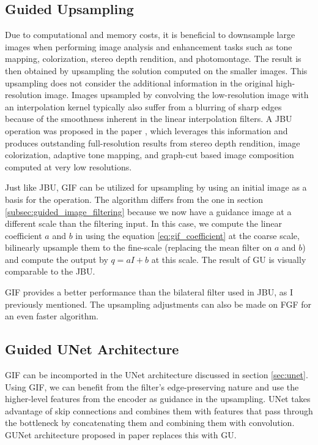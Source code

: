 \subsection{Guided Upsampling}
\label{subsec:guided_upsampling}

Due to computational and memory costs, it is beneficial to downsample large images when performing image analysis and enhancement tasks such as tone mapping, colorization, stereo depth rendition, and photomontage. The result is then obtained by upsampling the solution computed on the smaller images. This upsampling does not consider the additional information in the original high-resolution image. Images upsampled by convolving the low-resolution image with an interpolation kernel typically also suffer from a blurring of sharp edges because of the smoothness inherent in the linear interpolation filters. A \gls{JBU} operation was proposed in the paper \cite{bilateral}, which leverages this information and produces outstanding full-resolution results from stereo depth rendition, image colorization, adaptive tone mapping, and graph-cut based image composition computed at very low resolutions.

Just like \gls{JBU}, \gls{GIF} can be utilized for upsampling by using an initial image as a basis for the operation. The algorithm differs from the one in section \ref{subsec:guided_image_filtering} because we now have a guidance image at a different scale than the filtering input. In this case, we compute the linear coefficient $a$ and $b$ in using the equation \ref{eq:gif_coefficient} at the coarse scale, bilinearly upsample them to the fine-scale (replacing the mean filter on $a$ and $b$) and compute the output by $q = aI + b$ at this scale. The result of \gls{GU} is visually comparable to the \gls{JBU}. \cite{gif}

\gls{GIF} provides a better performance than the bilateral filter used in \gls{JBU}, as I previously mentioned. The upsampling adjustments can also be made on \gls{FGF} for an even faster algorithm.

\subsection{Guided UNet Architecture}
\label{subsec:review_gunet_architecture}

\gls{GIF} can be incomported in the UNet architecture discussed in section \ref{sec:unet}. Using \gls{GIF}, we can benefit from the filter's edge-preserving nature and use the higher-level features from the encoder as guidance in the upsampling. UNet takes advantage of skip connections and combines them with features that pass through the bottleneck by concatenating them and combining them with convolution. \gls{GUNet} architecture proposed in paper \cite{gunet} replaces this with \gls{GU}.

